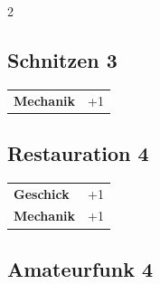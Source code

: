 \begin{multicols}{2}
\begin{tcolorbox}

\end{tcolorbox}

\begin{tcolorbox}
    \subsection*{Schnitzen \hfill \small{3 }}
    \tcblower




\begin{tabular}{@{}ll@{}}
    \textbf{Mechanik} & +1\\
\end{tabular}


\end{tcolorbox}

\begin{tcolorbox}
    \subsection*{Restauration \hfill \small{4 }}
    \tcblower




\begin{tabular}{@{}ll@{}}
    \textbf{Geschick} & +1\\
    \textbf{Mechanik} & +1\\
\end{tabular}


\end{tcolorbox}

\begin{tcolorbox}
    \subsection*{Amateurfunk \hfill \small{4 }}
    \tcblower





\end{tcolorbox}
\end{multicols}
